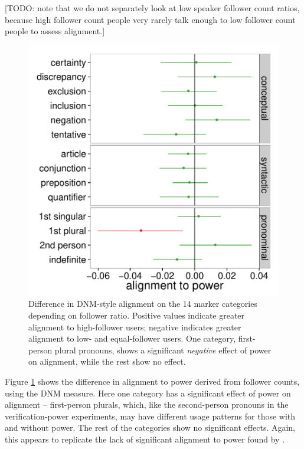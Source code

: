 \documentclass{acm_proc_article-sp}
\begin{document}
[TODO: note that we do not separately look at low speaker follower count ratios, because high follower count people very rarely talk enough to low follower count people to assess alignment.]

\begin{figure}[t]
\centering
\includegraphics[width=.9\columnwidth]{graphics/www2016_dnmpowerdiff_fratio_final.pdf}
\caption{Difference in DNM-style alignment on the 14 marker categories depending on follower ratio. Positive values indicate greater alignment to high-follower users; negative indicates greater alignment to low- and equal-follower users. One category, first-person plural pronouns, shows a significant \textit{negative} effect of power on alignment, while the rest show no effect.}\label{fig:dnm-fratio}
\end{figure}

Figure \ref{fig:dnm-fratio} shows the difference in alignment to power derived from follower counts, using the DNM measure. Here one category has a significant effect of power on alignment -- first-person plurals, which, like the second-person pronouns in the verification-power experiments, may have different usage patterns for those with and without power.  The rest of the categories show no significant effects.  Again, this appears to replicate the lack of significant alignment to power found by \cite{DNMGamonDumais2011}.
\end{document}
